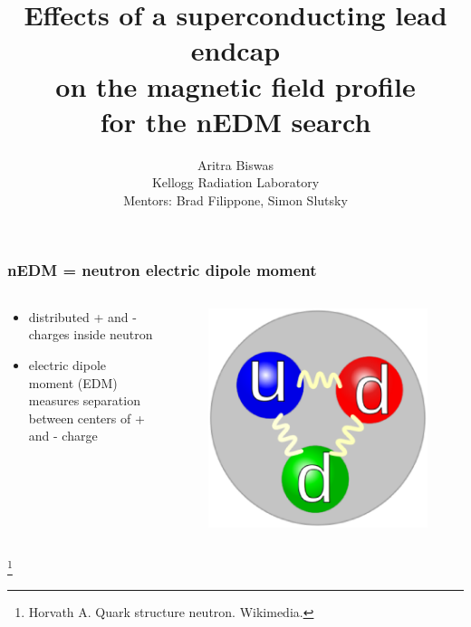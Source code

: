 \documentclass{beamer}
\newcommand{\bottomcite}{\let\thefootnote\relax\footnote}
\begin{document}

\title{Effects of a superconducting lead endcap\\ on the magnetic field profile \\ for the nEDM search}
\author{Aritra Biswas\\Kellogg Radiation Laboratory\\Mentors: Brad Filippone, Simon Slutsky}
\maketitle

\begin{frame}
\frametitle{nEDM = neutron electric dipole moment}

    \begin{columns}

    \begin{column}{0.5\textwidth}
    \begin{itemize}
        \item distributed + and - charges inside neutron
        \item electric dipole moment (EDM) measures separation between
              centers of + and - charge
    \end{itemize}
    \end{column}
    
    \begin{column}{0.5\textwidth}
    \begin{figure}
    \includegraphics[width=\textwidth]{figures/neutron_quarks.eps}
    \end{figure}
    \end{column}

    \end{columns}

    \bottomcite{Horvath A. Quark structure neutron. Wikimedia.}

\end{frame}
\end{document}
